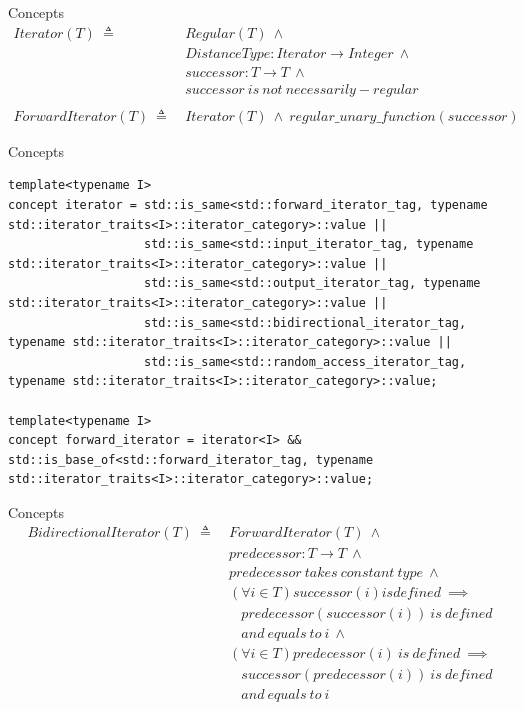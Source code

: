 \documentclass[10pt]{beamer}
\begin{document}
\begin{frame}{Concepts}
    \begin{align*}
        Iterator(T) ~\triangleq~ & Regular(T) ~\land \\
        & DistanceType: Iterator \rightarrow Integer ~\land \\
        & successor: T \rightarrow T ~\land\\
        & successor~is~not~necessarily-regular\\\\
        ForwardIterator(T) ~\triangleq~ & Iterator(T) ~\land ~regular\_unary\_function(successor)
    \end{align*}
\end{frame}


\begin{frame}[fragile]{Concepts}
\begin{lstlisting}[style=cpp]
template<typename I>
concept iterator = std::is_same<std::forward_iterator_tag, typename std::iterator_traits<I>::iterator_category>::value ||
                   std::is_same<std::input_iterator_tag, typename std::iterator_traits<I>::iterator_category>::value ||
                   std::is_same<std::output_iterator_tag, typename std::iterator_traits<I>::iterator_category>::value ||
                   std::is_same<std::bidirectional_iterator_tag, typename std::iterator_traits<I>::iterator_category>::value ||
                   std::is_same<std::random_access_iterator_tag, typename std::iterator_traits<I>::iterator_category>::value;

template<typename I>
concept forward_iterator = iterator<I> && std::is_base_of<std::forward_iterator_tag, typename std::iterator_traits<I>::iterator_category>::value;
\end{lstlisting}
\end{frame}

\begin{frame}{Concepts}
    \begin{align*}
        BidirectionalIterator(T) ~\triangleq~ & ForwardIterator(T) ~\land \\
                                              & predecessor: T \rightarrow T ~\land \\
                                              & predecessor~takes~constant~type ~\land \\
                                              & (\forall i \in T) successor(i) is defined~\implies \\
                                              & ~~~~predecessor(successor(i))~is~defined \\
                                              & ~~~~and~equals~to~i~ \land\\
                                              & (\forall i \in T) predecessor(i)~is~defined~ \implies \\
                                              & ~~~~successor(predecessor(i))~is~defined\\
                                              & ~~~~and~equals~to~i
    \end{align*}
\end{frame}
\end{document}
